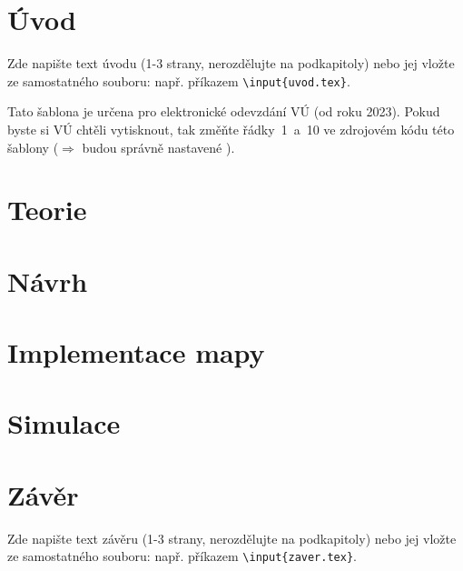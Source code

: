 \documentclass[a4paper,oneside,czech,12pt]{book} %
\newcommand{\ti}{\textit} %
\begin{document}
\parskip=0pt
\tableofcontents %
\parskip=7pt



\chapter*{Úvod} %
%
Zde napište text úvodu (1-3 strany, nerozdělujte na podkapitoly) nebo jej vložte ze samostatného souboru: např. příkazem \texttt{\textbackslash input\{uvod.tex\}}.

Tato šablona je určena {\color{red}pro elektronické odevzdání VÚ} (od roku 2023). Pokud byste si VÚ chtěli vytisknout, tak změňte řádky~1~a~10 ve zdrojovém kódu této šablony ($\Rightarrow$ budou správně nastavené ).
%
%


\chapter{Teorie}


\chapter{Návrh}


\chapter{Implementace mapy}


\chapter{Simulace}


\chapter*{Závěr}
%
Zde napište text závěru (1-3 strany, nerozdělujte na podkapitoly) nebo jej vložte ze samostatného souboru: např. příkazem \texttt{\textbackslash input\{zaver.tex\}}.
%
%


\end{document}
